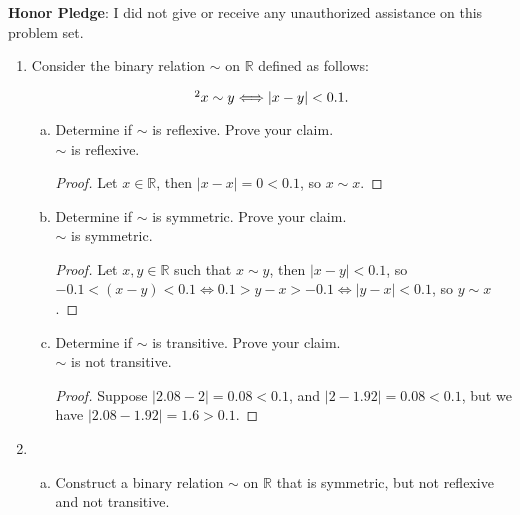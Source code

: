 \documentclass[12pt]{amsart}
\newcommand{\abs}[1]{\ensuremath{\left\lvert #1\right\rvert}}
\begin{document}
\vfill
\noindent
\textbf{Honor Pledge}: I did not give or receive any unauthorized assistance on this problem set.

\vspace{0.5in}
\hfill\makebox[3.0in]{\hrulefill}

\hfill{}

\newpage
\begin{enumerate}[{\bfseries 1.}]
\item Consider the binary relation $\sim$ on $\mathbb{R}$ defined as follows:

	$$\footnotemark[2] x\sim y\Longleftrightarrow \abs{x-y}<0.1.$$

	\begin{enumerate}[(a)]
	\vspace{0.2in}
	\item Determine if $\sim$ is reflexive.  Prove your claim.
	    \\$\sim$ is reflexive.
		\begin{proof}
		Let $x \in\mathbb{R}$, then $\abs{x - x} = 0 < 0.1$, so $x\sim x$.
		\end{proof}
	\vspace{0.1in}
	\item Determine if $\sim$ is symmetric.  Prove your claim.
	    \\$\sim$ is symmetric.
		\begin{proof}
		Let $x, y \in\mathbb{R}$ such that $x\sim y$, then $\abs{x - y} < 0.1$, so $-0.1 < (x - y) < 0.1 \iff 0.1 > y - x > -0.1 \iff \abs{y - x} < 0.1$, so $y\sim x$.
		\end{proof}
	\vspace{0.1in}
	\item Determine if $\sim$ is transitive.  Prove your claim.
	    \\$\sim$ is not transitive.
		\begin{proof}
		Suppose $\abs{2.08 - 2} = 0.08 < 0.1$, and $\abs{2 - 1.92} = 0.08 < 0.1$, but we have $\abs{2.08 - 1.92} = 1.6 > 0.1$.
		\end{proof}
	\end{enumerate}

\newpage
\item\begin{enumerate}[(a)]
	\vspace{0.1in}
	\item Construct a binary relation $\sim$ on $\mathbb{R}$ that is symmetric, but not reflexive and not transitive.


\end{enumerate}
\end{enumerate}
\end{document}
